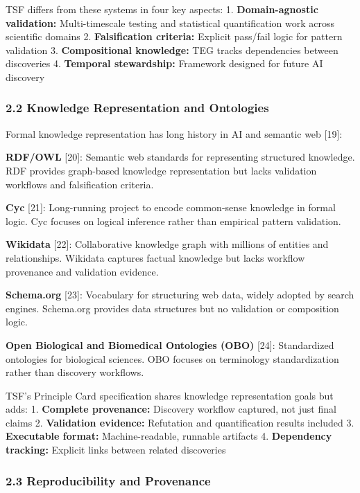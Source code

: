 \documentclass[
]{article}
\begin{document}
TSF differs from these systems in four key aspects: 1.
\textbf{Domain-agnostic validation:} Multi-timescale testing and
statistical quantification work across scientific domains 2.
\textbf{Falsification criteria:} Explicit pass/fail logic for pattern
validation 3. \textbf{Compositional knowledge:} TEG tracks dependencies
between discoveries 4. \textbf{Temporal stewardship:} Framework designed
for future AI discovery

\subsubsection{2.2 Knowledge Representation and
Ontologies}\label{knowledge-representation-and-ontologies}

Formal knowledge representation has long history in AI and semantic web
{[}19{]}:

\textbf{RDF/OWL} {[}20{]}: Semantic web standards for representing
structured knowledge. RDF provides graph-based knowledge representation
but lacks validation workflows and falsification criteria.

\textbf{Cyc} {[}21{]}: Long-running project to encode common-sense
knowledge in formal logic. Cyc focuses on logical inference rather than
empirical pattern validation.

\textbf{Wikidata} {[}22{]}: Collaborative knowledge graph with millions
of entities and relationships. Wikidata captures factual knowledge but
lacks workflow provenance and validation evidence.

\textbf{Schema.org} {[}23{]}: Vocabulary for structuring web data,
widely adopted by search engines. Schema.org provides data structures
but no validation or composition logic.

\textbf{Open Biological and Biomedical Ontologies (OBO)} {[}24{]}:
Standardized ontologies for biological sciences. OBO focuses on
terminology standardization rather than discovery workflows.

TSF's Principle Card specification shares knowledge representation goals
but adds: 1. \textbf{Complete provenance:} Discovery workflow captured,
not just final claims 2. \textbf{Validation evidence:} Refutation and
quantification results included 3. \textbf{Executable format:}
Machine-readable, runnable artifacts 4. \textbf{Dependency tracking:}
Explicit links between related discoveries

\subsubsection{2.3 Reproducibility and
Provenance}\label{reproducibility-and-provenance}
\end{document}
